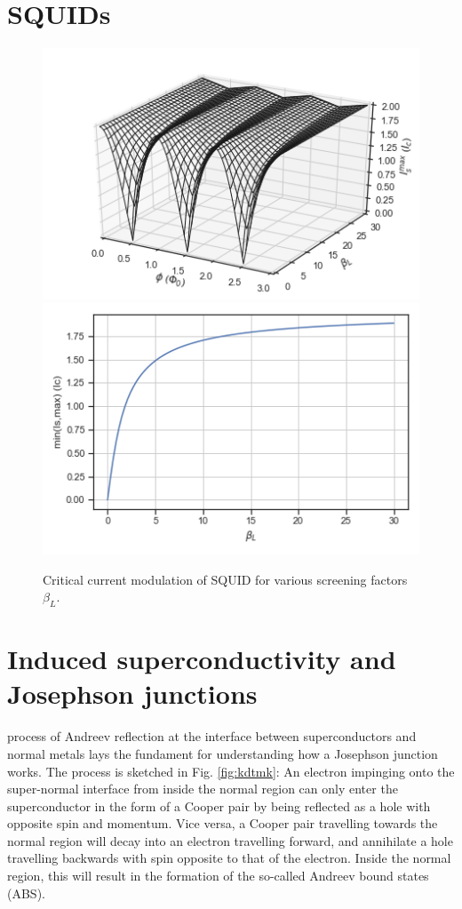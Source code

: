 \section{SQUIDs}

\begin{figure}
	\centering
	\includegraphics[width=0.5\linewidth]{./chapter-theory/figs-JJ/SQUID_betaL}
	\includegraphics[width=0.4\linewidth]{./chapter-theory/figs-JJ/SQUID_betaL_I}
	\caption{Critical current modulation of SQUID for various screening factors $\beta_L$.}
	\label{fig:betaL}
\end{figure}

\section{Induced superconductivity and Josephson junctions}

 process of Andreev reflection at the interface between superconductors and normal metals lays the fundament for understanding how a Josephson junction works.
The process is sketched in Fig. \ref{fig:kdtmk}:
An electron impinging onto the super-normal interface from inside the normal region can only enter the superconductor in the form of a Cooper pair by being reflected as a hole with opposite spin and momentum.
Vice versa, a Cooper pair travelling towards the normal region will decay into an electron travelling forward, and annihilate a hole travelling backwards with spin opposite to that of the electron.
Inside the normal region, this will result in the formation of the so-called Andreev bound states (ABS).

